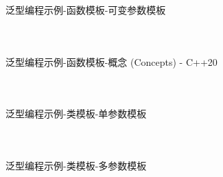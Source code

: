 \documentclass[UTF8,aspectratio=169]{beamer}
\begin{document}
\begin{frame}[fragile]{泛型编程示例-函数模板-可变参数模板}
    \begin{columns}
        \begin{column}{0.48\textwidth}
            \inputminted[firstline=1,lastline=13]{cpp}{code/gp_function_template_4.cpp}
        \end{column}
        \begin{column}{0.48\textwidth}
            \inputminted[firstline=15,lastline=25]{cpp}{code/gp_function_template_4.cpp}
        \end{column}
    \end{columns}
\end{frame}

\begin{frame}[fragile]{泛型编程示例-函数模板-概念 (Concepts) - C++20}
    \begin{columns}
        \begin{column}{0.48\textwidth}
            \inputminted[firstline=1,lastline=13]{cpp}{code/gp_function_template_5.cpp}
        \end{column}
        \begin{column}{0.48\textwidth}
            \inputminted[firstline=15,lastline=32]{cpp}{code/gp_function_template_5.cpp}
        \end{column}
    \end{columns}
\end{frame}

\begin{frame}[fragile]{泛型编程示例-类模板-单参数模板}
    \begin{columns}
        \begin{column}{0.48\textwidth}
            \inputminted[firstline=1,lastline=20]{cpp}{code/gp_class_template_1.cpp}
        \end{column}
        \begin{column}{0.48\textwidth}
            \inputminted[firstline=22,lastline=40]{cpp}{code/gp_class_template_1.cpp}
        \end{column}
    \end{columns}
\end{frame}

\begin{frame}[fragile]{泛型编程示例-类模板-多参数模板}
    \begin{columns}
        \begin{column}{0.48\textwidth}
            \inputminted[firstline=1,lastline=21]{cpp}{code/gp_class_template_2.cpp}
        \end{column}
        \begin{column}{0.48\textwidth}
            \inputminted[firstline=23,lastline=40]{cpp}{code/gp_class_template_2.cpp}
        \end{column}
    \end{columns}
\end{frame}
\end{document}
